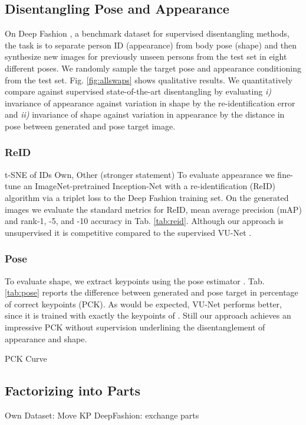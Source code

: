 	\subsection{Disentangling Pose and Appearance}
	On Deep Fashion \cite{Liu:2015vj, Liu:2016vv}, a benchmark dataset for supervised disentangling methods, the task is to separate person ID (appearance) from body pose (shape) and then synthesize new images for previously unseen persons from the test set in eight different poses. We randomly sample the target pose and appearance conditioning from the test set. Fig. \ref{fig:allswaps} shows qualitative results.
	We quantitatively compare against supervised state-of-the-art disentangling \cite{Esser:2018ue} by evaluating \emph{i)} invariance of appearance against variation in shape by the re-identification error and \emph{ii)} invariance of shape against variation in appearance by the distance in pose between generated and pose target image.

	\subsubsection{ReID}
	t-SNE of IDs
	Own, Other (stronger statement)
	To evaluate appearance we fine-tune an ImageNet-pretrained \cite{Russakovsky2015imagenet} Inception-Net \cite{Szegedy2015inception} with a re-identification (ReID) algorithm \cite{Xiao:2017} via a triplet loss \cite{Hermans:2017} to the Deep Fashion training set.
	On the generated images we evaluate the standard metrics for ReID, mean average precision (mAP) and rank-1, -5, and -10 accuracy in Tab. \ref{tab:reid}.
	Although our approach is unsupervised it is competitive compared to the supervised VU-Net \cite{Esser:2018ue}.



	\subsubsection{Pose}
	To evaluate shape, we extract keypoints using the pose estimator \cite{Cao:2017vv}. Tab. \ref{tab:pose} reports the difference between generated and pose target in percentage of correct keypoints (PCK). As would be expected, VU-Net performs better, since it is trained with exactly the keypoints of \cite{Cao:2017vv}. Still our approach achieves an impressive PCK without supervision underlining the disentanglement of appearance and shape.


	PCK Curve
	\subsection{Factorizing into Parts}
		Own Dataset: Move KP
		DeepFashion: exchange parts
